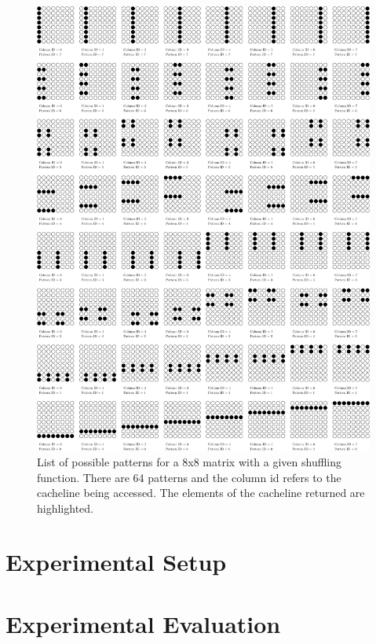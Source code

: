 \documentclass[letterpaper]{article}
\begin{document}
\begin{figure}[ht]
	\centering
	\includegraphics[scale=0.35]{images/pattern}
	\caption{List of possible patterns for a 8x8 matrix with a given shuffling
	function. There are 64 patterns and the column id refers to the cacheline
	being accessed. The elements of the cacheline returned are highlighted.}
	\label{fig:pattern}
\end{figure}

\section{Experimental Setup}

\section{Experimental Evaluation}
\end{document}
